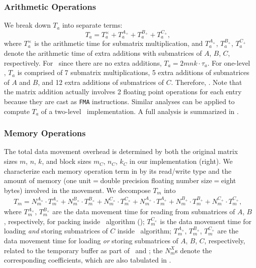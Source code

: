 \subsubsection*{Arithmetic Operations}
We break down $T_{a}$ into separate terms: 
\begin{equation}
  T_{a} = T_{a}^{\times} + T_{a}^{A_{+}} + T_{a}^{B_{+}} + T_{a}^{C_{+}}, 
  \label{e:fptime}
\end{equation}
where $T_{a}^{\times}$ is the arithmetic time for submatrix multiplication, and $T_{a}^{A_{+}}$, $T_{a}^{B_{+}}$, $T_{a}^{C_{+}}$ 
denote the arithmetic time of extra additions with submatrices of $A$, $B$, $C$, respectively. For \dgemm\, since there are no
extra additions, $T_{a} = 2mnk \cdot\tau_{a}$. For one-level \strassen{}, $T_a$ is comprised of 7 submatrix multiplications, 5 extra additions
of submatrices of $A$ and $B$, and 12 extra additions of submatrices of $C$. Therefore, 
.
Note that the matrix addition actually involves 2 floating point operations for each entry because they are cast as
{\tt FMA} instructions.
Similar analyses can be applied to compute $T_{a}$ of a two-level \strassen\ implementation.
A full analysis is summarized in .

\subsubsection*{Memory Operations}
The total data movement overhead is determined by both the original matrix sizes $m$, $n$, $k$, and block sizes
$m_C$, $n_C$, $k_C$ in our implementation (right).
We characterize each memory operation term in  by its read/write type and the amount of memory (one unit$=$double precision floating number size$=$eight bytes) involved in the movement.
We decompose $T_{m}$ into
\begin{multline}
  T_{m} = N_{m}^{A_{\times}} \cdot T_{m}^{A_{\times}} + N_{m}^{B_{\times}} \cdot T_{m}^{B_{\times}} + N_{m}^{C_{\times}} \cdot T_{m}^{C_{\times}}  
  + N_{m}^{A_{+}} \cdot T_{m}^{A_{+}} + N_{m}^{B_{+}} \cdot T_{m}^{B_{+}} + N_{m}^{C_{+}} \cdot T_{m}^{C_{+}}, 
\end{multline}
where $T_{m}^{A_{\times}}$, $T_{m}^{B_{\times}}$ are the data movement time for reading from submatrices of $A$, $B$, respectively, for packing
 inside \GOTO{} \gemm\ algorithm ();
$T_{m}^{C_{\times}}$ is the data movement time for loading \emph{and} storing submatrices of $C$ inside \gemm\ algorithm;
$T_{m}^{A_{+}}$, $T_{m}^{B_{+}}$, $T_{m}^{C_{+}}$ are the data movement time for loading \emph{or} storing submatrices of $A$, $B$, $C$, respectively, related to the temporary buffer as part of \XXXstrassen\ and \ABXstrassen{}; the $N_m^X$s denote the corresponding coefficients, which are also tabulated in .



